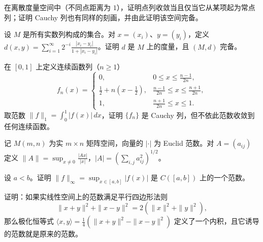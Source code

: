 \noindent\begin{minipage}{\textwidth}
在离散度量空间中（不同点距离为 $1$），证明点列收敛当且仅当它从某项起为常点列；证明 Cauchy 列也有同样的刻画，并由此证明该空间完备。
\end{minipage}\par\vfill
\noindent\begin{minipage}{\textwidth}
设 $M$ 是所有实数列构成的集合。对 $x=(x_i)$、$y=(y_i)$，定义 $\displaystyle d(x,y)=\sum_{i=1}^{\infty}2^{-i}\frac{|x_i-y_i|}{1+|x_i-y_i|}$。证明 $d$ 是 $M$ 上的度量，且 $(M,d)$ 完备。
\end{minipage}\par\vfill
\newpage
\noindent\begin{minipage}{\textwidth}
在 $[0,1]$ 上定义连续函数列（$n\ge1$）\[f_n(x)=\begin{cases}0,&0\le x\le\frac{n-1}{2n},\\\frac12+n(x-\frac12),&\frac{n-1}{2n}\le x\le\frac{n+1}{2n},\\1,&\frac{n+1}{2n}\le x\le1.\end{cases}\]取范数 $\|f\|_1=\int_0^1|f(x)|\,dx$，证明 $\{f_n\}$ 是 Cauchy 列，但不依此范数收敛到任何连续函数。
\end{minipage}\par\vfill
\newpage
\noindent\begin{minipage}{\textwidth}
记 $M(m,n)$ 为实 $m\times n$ 矩阵空间，向量的 $|\cdot|$ 为 Euclid 范数。对 $A=(a_{ij})$ 定义 $\displaystyle\|A\|=\sup_{x\ne0}\frac{|Ax|}{|x|}$，$\displaystyle|A|=(\sum_{i,j}a_{ij}^2)^{1/2}$。
\end{minipage}\par\vfill
\newpage
\noindent\begin{minipage}{\textwidth}
设 $a<b$。证明 $\displaystyle\|f\|_\infty=\sup_{x\in[a,b]}|f(x)|$ 是 $C([a,b])$ 上的一个范数。
\end{minipage}\par\vfill
\noindent\begin{minipage}{\textwidth}
证明：如果实线性空间上的范数满足平行四边形法则\[\|x+y\|^2+\|x-y\|^2=2(\|x\|^2+\|y\|^2),\]那么极化恒等式 $\langle x,y\rangle=\frac14(\|x+y\|^2-\|x-y\|^2)$ 定义了一个内积，且它诱导的范数就是原来的范数。
\end{minipage}\par\vfill
